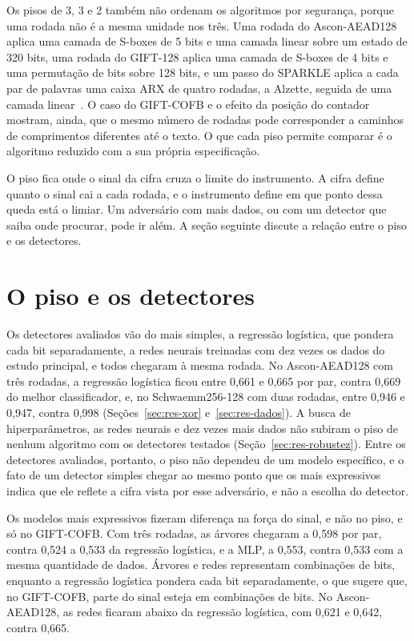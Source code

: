 Os pisos de 3, 3 e 2 também não ordenam os algoritmos por segurança, porque uma rodada não é a mesma unidade nos três. Uma rodada do Ascon-AEAD128 aplica uma camada de S-boxes de 5 bits e uma camada linear sobre um estado de 320 bits, uma rodada do GIFT-128 aplica uma camada de S-boxes de 4 bits e uma permutação de bits sobre 128 bits, e um passo do SPARKLE aplica a cada par de palavras uma caixa ARX de quatro rodadas, a Alzette, seguida de uma camada linear~\cite{Beierle2020Sparkle}. O caso do GIFT-COFB e o efeito da posição do contador mostram, ainda, que o mesmo número de rodadas pode corresponder a caminhos de comprimentos diferentes até o texto. O que cada piso permite comparar é o algoritmo reduzido com a sua própria especificação.

O piso fica onde o sinal da cifra cruza o limite do instrumento. A cifra define quanto o sinal cai a cada rodada, e o instrumento define em que ponto dessa queda está o limiar. Um adversário com mais dados, ou com um detector que saiba onde procurar, pode ir além. A seção seguinte discute a relação entre o piso e os detectores.


\section{O piso e os detectores}
\label{sec:disc-detectores}

Os detectores avaliados vão do mais simples, a regressão logística, que pondera cada bit separadamente, a redes neurais treinadas com dez vezes os dados do estudo principal, e todos chegaram à mesma rodada. No Ascon-AEAD128 com três rodadas, a regressão logística ficou entre 0,661 e 0,665 por par, contra 0,669 do melhor classificador, e, no Schwaemm256-128 com duas rodadas, entre 0,946 e 0,947, contra 0,998 (Seções~\ref{sec:res-xor} e~\ref{sec:res-dados}). A busca de hiperparâmetros, as redes neurais e dez vezes mais dados não subiram o piso de nenhum algoritmo com os detectores testados (Seção~\ref{sec:res-robustez}). Entre os detectores avaliados, portanto, o piso não dependeu de um modelo específico, e o fato de um detector simples chegar ao mesmo ponto que os mais expressivos indica que ele reflete a cifra vista por esse adversário, e não a escolha do detector.

Os modelos mais expressivos fizeram diferença na força do sinal, e não no piso, e só no GIFT-COFB. Com três rodadas, as árvores chegaram a 0,598 por par, contra 0,524 a 0,533 da regressão logística, e a MLP, a 0,553, contra 0,533 com a mesma quantidade de dados. Árvores e redes representam combinações de bits, enquanto a regressão logística pondera cada bit separadamente, o que sugere que, no GIFT-COFB, parte do sinal esteja em combinações de bits. No Ascon-AEAD128, as redes ficaram abaixo da regressão logística, com 0,621 e 0,642, contra 0,665.

